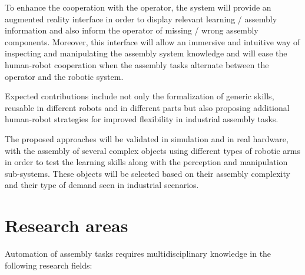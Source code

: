 To enhance the cooperation with the operator, the system will provide an augmented reality interface in order to display relevant learning / assembly information and also inform the operator of missing / wrong assembly components. Moreover, this interface will allow an immersive and intuitive way of inspecting and manipulating the assembly system knowledge and will ease the human-robot cooperation when the assembly tasks alternate between the operator and the robotic system.

Expected contributions include not only the formalization of generic skills, reusable in different robots and in different parts but also proposing additional human-robot strategies for improved flexibility in industrial assembly tasks.

The proposed approaches will be validated in simulation and in real hardware, with the assembly of several complex objects using different types of robotic arms in order to test the learning skills along with the perception and manipulation sub-systems. These objects will be selected based on their assembly complexity and their type of demand seen in industrial scenarios.



\section{Research areas}

Automation of assembly tasks requires multidisciplinary knowledge in the following research fields:

